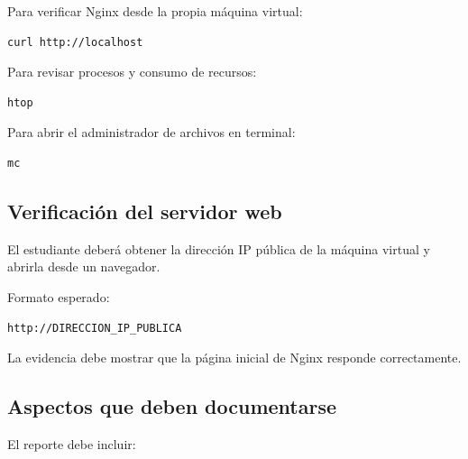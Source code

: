 \documentclass[
  coursetitle={Cómputo Nube y Tecnologías Emergentes},
  coursehours={96},
  coursedate={Verano 2026},
  doctype={Tarea 2},
  otherlangs={english,french},
  authorname={Lázaro},
  authorsurname={Bustio-Martínez},
  authortitle={PhD},
  role={Profesor Investigador},
  email={lbustio@inaoe.mx},
  phone={5559504000},
  ext={7459},
  institution={Instituto Nacional de Astrofísica, Óptica y Electrónica (INAOE)},
  department={Maestría en Ciencias en Tecnologías de Seguridad},
  address={Luis Enrique Erro 1, Sta. Ma. Tonantzintla, San Andrés Cholula, CP 72840, Puebla, México},
  margin={0.5in}
]{../../../lbustio_lecture_notes}
\begin{document}
Para verificar Nginx desde la propia máquina virtual:

\begin{verbatim}
curl http://localhost
\end{verbatim}

Para revisar procesos y consumo de recursos:

\begin{verbatim}
htop
\end{verbatim}

Para abrir el administrador de archivos en terminal:

\begin{verbatim}
mc
\end{verbatim}

\subsection{Verificación del servidor web}
\label{sec:tarea2-verificacion-web}

El estudiante deberá obtener la dirección IP pública de la máquina virtual y abrirla desde un navegador.

Formato esperado:

\begin{verbatim}
http://DIRECCION_IP_PUBLICA
\end{verbatim}

La evidencia debe mostrar que la página inicial de Nginx responde correctamente.

\subsection{Aspectos que deben documentarse}
\label{sec:tarea2-aspectos}

El reporte debe incluir:
\end{document}
